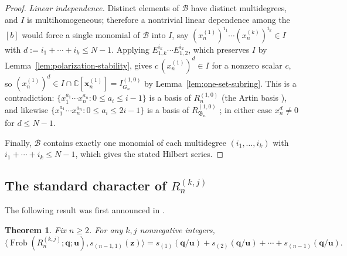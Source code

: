 \documentclass[12pt]{amsart}
\theoremstyle{plain}
\newtheorem{theorem}{Theorem}[section]
\theoremstyle{definition}
\DeclareMathOperator{\Frob}{Frob}
\newcommand{\C}{\mathbb{C}}
\newcommand{\z}{\mathbf{z}}
\begin{document}
\begin{proof}
    \emph{Linear independence.} Distinct elements of $\mathcal{B}$ have distinct multidegrees, and $I$ is multihomogeneous; therefore a nontrivial linear dependence among the $[b]$ would force a single monomial of $\mathcal{B}$ into $I$, say $(x^{(1)}_n)^{i_1}\cdots(x^{(k)}_n)^{i_k} \in I$ with $d := i_1+\cdots+i_k \leq N-1$. 
    Applying $E_{1,k}^{i_k} \cdots E_{1,2}^{i_2}$, which preserves $I$ by Lemma~\ref{lem:polarization-stability}, gives $c\,(x^{(1)}_n)^{d} \in I$ for a nonzero scalar $c$, so $(x^{(1)}_n)^{d} \in I \cap \C[\bm{x}^{(1)}_n] = I_{G_n}^{(1,0)}$ by Lemma~\ref{lem:one-set-subring}. 
    This is a contradiction: $\{x_1^{a_1}\cdots x_n^{a_n} : 0 \leq a_i \leq i-1\}$ is a basis of $R_n^{(1,0)}$ (the Artin basis \cite{Artin}), and likewise $\{x_1^{a_1}\cdots x_n^{a_n} : 0 \leq a_i \leq 2i-1\}$ is a basis of $R_{\mathfrak{B}_n}^{(1,0)}$ \cite[Section 5]{SwansonWallachII}; in either case $x_n^{d} \neq 0$ for $d \leq N-1$.

    Finally, $\mathcal{B}$ contains exactly one monomial of each multidegree $(i_1,\ldots,i_k)$ with $i_1+\cdots+i_k \leq N-1$, which gives the stated Hilbert series.
\end{proof}

\subsection{The standard character of \texorpdfstring{$R_{n}^{(k,j)}$}{Rn(k,j)}}\label{subsec:standard}

The following result was first announced in \cite{Lentfer-dissertation}.
\begin{theorem}\label{thm:standard-character} Fix $n \geq 2$. For any $k,j$
nonnegative integers,
    \begin{equation}
        \langle \Frob(R_n^{(k,j)}; \mathbf{q};\mathbf{u}),
        s_{(n-1,1)}(\z) \rangle
        = s_{(1)}(\mathbf{q}/\mathbf{u}) + s_{(2)}(\mathbf{q}/\mathbf{u})
        + \cdots + s_{(n-1)}(\mathbf{q}/\mathbf{u}).
    \end{equation}
\end{theorem}
\end{document}
